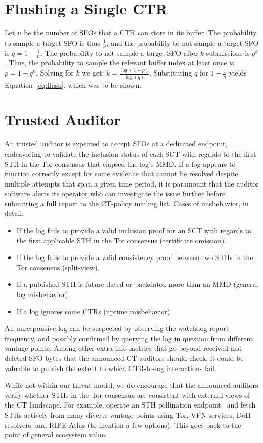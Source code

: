 \section{Flushing a Single CTR} \label{app:flush}
Let $n$ be the number of SFOs that a CTR can store in its buffer.  The
probability to sample a target SFO is thus $\frac{1}{n}$, and the probability to
not sample a target SFO is $q = 1 - \frac{1}{n}$.  The probability to not sample
a target SFO after $k$ submissions is $q^k$.  Thus, the probability to sample
the relevant buffer index at least once is $p = 1 - q^k$.  Solving for $k$ we
get: $k = \frac{\log(1 - p)}{\log(q)}$.  Substituting $q$ for $1 - \frac{1}{n}$
yields Equation~\ref{eq:flush}, which was to be shown.

\section{Trusted Auditor} \label{app:auditor}
An trusted auditor is expected to accept SFOs at a dedicated endpoint,
endeavoring to validate the inclusion status of each SCT with regards to the
first STH in the Tor consensus that elapsed the log's MMD.  If a log appears to
function correctly except for some evidence that cannot be
resolved despite multiple attempts that span a given time period, it is
paramount that the auditor software alerts its operator who can investigate
the issue further before submitting a full report to the CT-policy mailing list.
Cases of misbehavior, in detail:
\begin{itemize}
	\item If the log fails to provide a valid inclusion proof for an SCT with
		regards to the first applicable STH in the Tor consensus
		(certificate omission).
	\item If the log fails to provide a valid consistency proof between two
		STHs in the Tor consensus
		(split-view).
	\item If a published STH is future-dated or backdated more than an MMD
		(general log misbehavior).
	\item If a log ignores some CTRs (uptime misbehavior).
\end{itemize}

An unresponsive log can be suspected by observing the watchdog report frequency,
and possibly confirmed by querying the log in question from different vantage
points.  Among other extra-info metrics that go beyond received and deleted
SFO-bytes that the announced CT auditors should check, it could be valuable to
publish the extent to which CTR-to-log interactions fail.

While not within our threat model, we do encourage that the announced auditors
verify whether STHs in the Tor consensus are consistent with external views of
the CT landscape.  For example, operate an STH pollination
endpoint~\cite{nordberg} and fetch STHs actively from many diverse vantage
points using Tor, VPN services, DoH resolvers, and RIPE Atlas (to mention a few
options).  This goes back to the point of general ecosystem value.
